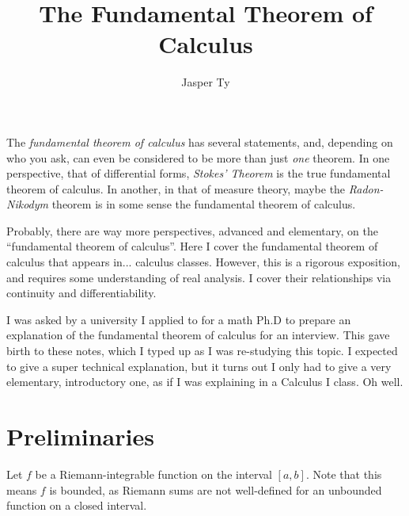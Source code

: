 \documentclass{article}
\title{The Fundamental Theorem of Calculus}
\author{Jasper Ty}
\date{}
\begin{document}
\maketitle 

The \emph{fundamental theorem of calculus} has several statements, and, depending on who you ask, can even be considered to be more than just \emph{one} theorem. In one perspective, that of differential forms, \emph{Stokes' Theorem} is the true fundamental theorem of calculus. In another, in that of measure theory, maybe the \emph{Radon-Nikodym} theorem is in some sense the fundamental theorem of calculus. 

Probably, there are way more perspectives, advanced and elementary, on the ``fundamental theorem of calculus''. Here I cover the fundamental theorem of calculus that appears in... calculus classes. However, this is a rigorous exposition, and requires some understanding of real analysis. I cover their relationships via continuity and differentiability.

I was asked by a university I applied to for a math Ph.D to prepare an explanation of the fundamental theorem of calculus for an interview. This gave birth to these notes, which I typed up as I was re-studying this topic. I expected to give a super technical explanation, but it turns out I only had to give a very elementary, introductory one, as if I was explaining in a Calculus I class. Oh well.

\section*{Preliminaries}
Let $f$ be a Riemann-integrable function on the interval $[a, b]$. Note that this means $f$ is bounded, as Riemann sums are not well-defined for an unbounded function on a closed interval.
\end{document}
